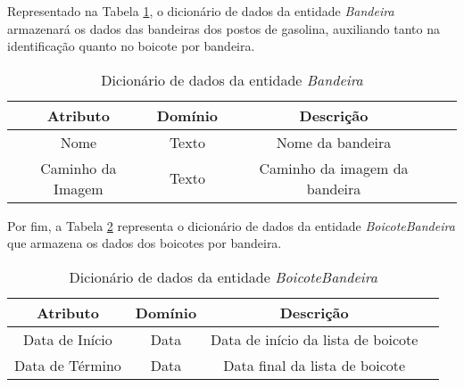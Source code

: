 Representado na Tabela \ref{dic:flag}, o dicionário de dados da entidade \textit{Bandeira} armazenará os dados das bandeiras dos postos de gasolina, auxiliando tanto na identificação quanto no boicote por bandeira.

\begin{table}[H]
\centering
\caption{Dicionário de dados da entidade \textit{Bandeira}}
\label{dic:flag}
\begin{tabular}{|c|c|c|c|}\hline
\textbf{Atributo} & \textbf{Domínio} & \textbf{Descrição}   \\ \hline
Nome                      & Texto                                           & Nome da bandeira \\ \hline
Caminho da Imagem                       & Texto                                           & Caminho da imagem da bandeira\\ \hline

\end{tabular}
\end{table}

Por fim, a Tabela \ref{dic:flag_boycott} representa o dicionário de dados da entidade \textit{BoicoteBandeira} que armazena os dados dos boicotes por bandeira.

\begin{table}[H]
\centering
\caption{Dicionário de dados da entidade \textit{BoicoteBandeira}}
\label{dic:flag_boycott}
\begin{tabular}{|c|c|c|c|}\hline
\textbf{Atributo} & \textbf{Domínio}  & \textbf{Descrição}   \\ \hline
Data de Início                      & Data                                           & Data de início da lista de boicote \\ \hline
Data de Término                       & Data                                         & Data final da lista de boicote\\ \hline

\end{tabular}
\end{table}
